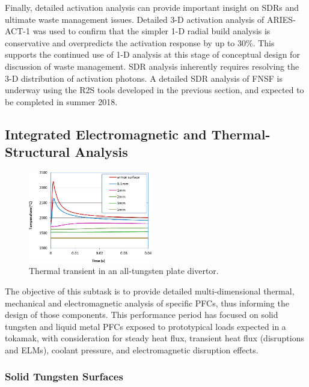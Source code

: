 Finally, detailed activation analysis can provide important insight on
\glspl{SDR} and ultimate waste management issues.  Detailed 3-D activation
analysis of ARIES-ACT-1 was used to confirm that the simpler 1-D radial build
analysis is conservative and overpredicts the activation response by up to
30\%.  This supports the continued use of 1-D analysis at this stage of
conceptual design for discussion of waste management.  \gls{SDR} analysis
inherently requires resolving the 3-D distribution of activation photons.  A
detailed \gls{SDR} analysis of FNSF is underway using the \gls{R2S} tools
developed in the previous section, and expected to be completed in summer
2018.

\subsection{Integrated Electromagnetic and Thermal-Structural Analysis}

\begin{figure}
\centering
\includegraphics[width=0.48\textwidth]{imgs/elm-thermal.png}
\caption{\label{fig:elm-thermal}Thermal transient in an all-tungsten plate divertor.}
\end{figure}

The objective of this subtask is to provide detailed multi-dimensional
thermal, mechanical and electromagnetic analysis of specific \glspl{PFC}, thus
informing the design of those components.  This performance period has focused
on solid tungsten and liquid metal \glspl{PFC} exposed to prototypical loads
expected in a tokamak, with consideration for steady heat flux, transient heat
flux (disruptions and \glspl{ELM}), coolant pressure, and electromagnetic
disruption effects.


\subsubsection{Solid Tungsten Surfaces}

